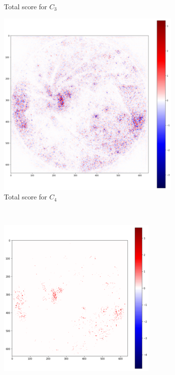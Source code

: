 \documentclass[preprint]{elsarticle}
\theoremstyle{definition} %
\theoremstyle{remark}
\begin{document}
\begin{figure}[h!]
\begin{subfigure}[b]{0.43\textwidth}
		\caption{Total score for $C_3$}
		\label{fig:score_total_c3}
	\end{subfigure}
	\begin{subfigure}[b]{0.43\textwidth}
		\includegraphics[width=\textwidth]{figures/score-prop-23713_left/score_total_c4.png}
		\caption{Total score for $C_4$}
		\label{fig:score_total_c4}
	\end{subfigure}~
	\begin{subfigure}[b]{0.43\textwidth}
		\includegraphics[width=\textwidth]{figures/score-prop-23713_left/score_total_c4_2std.png}

\end{subfigure}
\end{figure}
\end{document}
